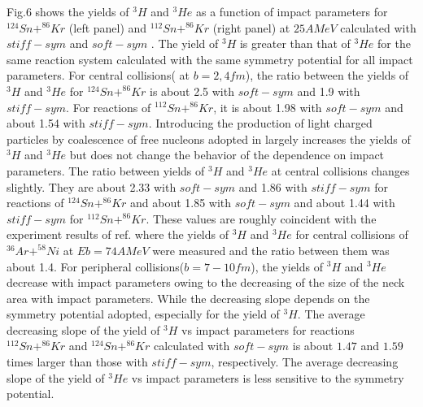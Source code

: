\documentclass[aps,prc,groupedaddress,showpacs,manuscript]{revtex4}
\begin{document}
Fig.6 shows the yields of $^{3}H$ and $^{3}He$  as a function of
impact parameters for $^{124}Sn+^{86}Kr$ (left panel) and
$^{112}Sn+^{86}Kr$ (right panel) at $25AMeV$ calculated with
$stiff-sym$ and $soft-sym$ . The yield of $^{3}H$ is greater than
that of $^{3}He$ for the same reaction system calculated with the
same symmetry potential for all impact parameters. For central
collisions( at $b=2,4fm$), the ratio between the yields of $^{3}H$
and $^{3}He$ for $^{124}Sn+^{86}Kr$ is about 2.5 with $soft-sym$
and 1.9 with $stiff-sym$. For reactions of $^{112}Sn+^{86}Kr$, it
is about 1.98 with $soft-sym$ and about 1.54 with $stiff-sym$.
Introducing the production of light charged particles by
coalescence of free nucleons adopted in \cite{Neu00} largely
increases the yields of $^{3}H$ and $^{3}He$ but does not change
the behavior of the dependence on impact parameters. The ratio
between yields of $^{3}H$ and $^{3}He$ at central collisions
changes slightly. They are about 2.33 with $soft-sym$ and 1.86
with $stiff-sym$ for reactions of $^{124}Sn+^{86}Kr$ and about
1.85 with $soft-sym$ and about 1.44 with $stiff-sym$ for
$^{112}Sn+^{86}Kr$. These values are roughly coincident with the
experiment results of ref. \cite{Lef99} where the yields of
$^{3}H$ and $^{3}He$ for central collisions of $^{36}Ar+^{58}Ni$
at $Eb=74AMeV$ were measured and the ratio between them was about
1.4. For peripheral collisions($b=7-10fm$), the yields of $^{3}H$
and $^{3}He$ decrease with impact parameters owing to the
decreasing of the size of the neck area with impact parameters.
While the decreasing slope depends on the symmetry potential
adopted, especially for the yield of $^{3}H$. The average
decreasing slope of the yield of $^{3}H$ vs impact parameters for
reactions $^{112}Sn+^{86}Kr$ and $^{124}Sn+^{86}Kr$ calculated
with $soft-sym$ is about $1.47$ and $1.59$ times larger than those
with $stiff-sym$, respectively. The average decreasing slope of
the yield of $^{3}He$ vs impact parameters is less sensitive to
the symmetry potential.
\end{document}
